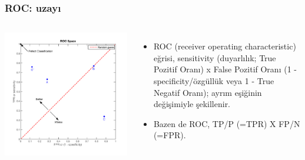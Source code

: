 \documentclass{beamer}
\begin{document}
\begin{frame}
	\frametitle{ROC: uzayı}

	\begin{columns}
			\includegraphics[height=0.8\textheight]{img/ROC_space.png}\label{fig:ROC-space}
			\begin{itemize}
				\item ROC (receiver operating characteristic) eğrisi,
					sensitivity (duyarlılık; True Pozitif Oranı) x False Pozitif
					Oranı (1 - specificity/özgüllük veya 1 - True Negatif
					Oranı); ayrım eşiğinin değişimiyle şekillenir.

				\item Bazen de ROC, TP/P (=TPR) X FP/N (=FPR).
			\end{itemize}
	\end{columns}
\end{frame}
\end{document}
